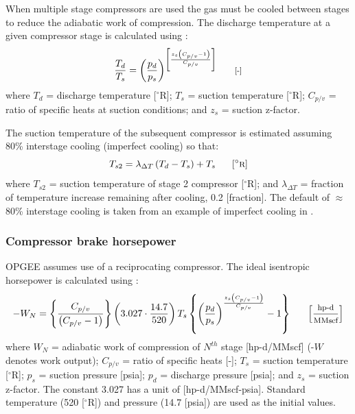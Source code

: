 \documentclass[11pt]{report}
\newcommand{\marg}[1]{{\footnotesize\textit{\textcolor{stanford}{'#1'}}}}
\newcommand{\marginnote}[1]{\marginpar{\marg{#1}}}
\begin{document}
{When multiple stage compressors are used the gas must be cooled between stages to reduce the adiabatic work of compression. The discharge temperature at a given compressor stage is calculated using \cite[p. 105]{Jarrell2002}: 
\begin{equation} \label{eq:compressor_discharge_temp}
\frac{T_{d}}{T_{s}}=\left(\frac{p_{d}}{p_{s}}\right)^{\left[\frac{z_{s}\left(C_{p/v}-1\right)}{C_{p/v}}\right]} \begin{footnotesize} \quad\quad\text{[-]} \end{footnotesize}
\end{equation}
where $T_{d}$ = discharge temperature [$^{\circ}$R]; $T_{s}$ = suction temperature [$^{\circ}${R}]; $C_{p/v}$ = ratio of specific heats at suction conditions; and $z_{s}$ = suction z-factor.

The suction temperature of the subsequent compressor is estimated assuming 80\% interstage cooling (imperfect cooling) so that: \marginnote{Production \& Extraction 2.5.3} 
\begin{equation} \label{eq:compressor2_suction_temp}
T_{s2}= \lambda_{\Delta T}\left(T_{d}-T_{s}\right) +T_{s} \begin{footnotesize} \quad\quad[^{\circ}\text{R}] \end{footnotesize}
\end{equation}
where $T_{s2}$ = suction temperature of stage 2 compressor [$^{\circ}${R}]; and $\lambda_{\Delta T}$ = fraction of temperature increase remaining after cooling, 0.2 [fraction]. The default of $\approx$80\% interstage cooling is taken from an example of imperfect cooling in \cite[Table 7]{UNEP2006}.


\subsubsection{Compressor brake horsepower} \marginnote{Production \& Extraction 2.5.6,2.6.5,2.7.6}

OPGEE assumes use of a reciprocating compressor. The ideal isentropic horsepower is calculated using \cite[p. 105]{Jarrell2002}:  
\begin{equation} \label{eq:compressor_work}
-W_{N}=\left\{{\frac{C_{p/v}}{\left(C_{p/v}-1\right)}}\right\} \left(3.027 \cdot \frac{14.7}{520}\right) T_{s}\left\{\left(\frac{p_{d}}{p_{s}}\right)^\frac{z_{s}\left(C_{p/v}-1\right)}{C_{p/v}}-1\right\} \begin{footnotesize} \quad\quad\left[\frac{\text{hp-d}}{\text{MMscf}}\right] \end{footnotesize}
\end{equation}
where $W_{N}$ = adiabatic work of compression of $N^{th}$ stage [hp-d/MMscf] (-$W$ denotes work output); $C_{p/v}$ = ratio of specific heats [-]; $T_{s}$ = suction temperature [$^{\circ}${R}]; $p_{s}$ = suction pressure [psia]; $p_{d}$ = discharge pressure [psia]; and $z_{s}$ = suction z-factor. The constant 3.027 has a unit of [hp-d/MMscf-psia]. Standard temperature (520 [$^{\circ}${R}]) and pressure (14.7 [psia]) are used as the initial values. 

}
\end{document}

